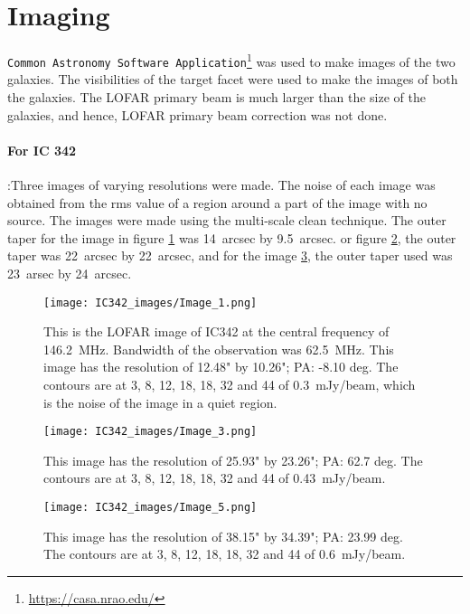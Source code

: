 \documentclass[../main/thesis_msc.tex]{subfiles}
\begin{document}
\section{Imaging}
\verb|Common Astronomy Software Application|\footnote{\url{https://casa.nrao.edu/}} was used to make images of the two galaxies. The visibilities of the target facet were used to make the images of both the galaxies. The LOFAR primary beam is much larger than the size of the galaxies, and hence, LOFAR primary beam correction was not done.  
\paragraph{For IC 342}:Three images of varying resolutions were made. The noise of each image was obtained from the rms value of a region around a part of the image with no source. The images were made using the multi-scale clean technique. The outer taper for the image in figure \ref{img1} was 14~arcsec by 9.5~arcsec. or figure \ref{img2}, the outer taper was 22~arcsec by 22~arcsec, and for the image \ref{img3}, the outer taper used was 23~arsec by 24~arcsec.

\begin{figure}[h]
\centering
\texttt{[image: IC342\_images/Image\_1.png]}
\caption{This is the LOFAR image of IC342 at the central frequency of 146.2~MHz. Bandwidth of the observation was 62.5~MHz. This image has the resolution of 12.48" by 10.26"; PA: -8.10 deg. The contours are at 3, 8, 12, 18, 18, 32 and 44 of 0.3~mJy/beam, which is the noise of the image in a quiet region.}
\label{img1}
\end{figure}

\begin{figure}[h]
\centering
\texttt{[image: IC342\_images/Image\_3.png]}
\caption{This image has the resolution of 25.93" by 23.26"; PA: 62.7 deg. The contours are at 3, 8, 12, 18, 18, 32 and 44 of 0.43~mJy/beam.}
\label{img2}
\end{figure}

\begin{figure}[h]
\centering
\texttt{[image: IC342\_images/Image\_5.png]}
\caption{This image has the resolution of 38.15" by 34.39"; PA: 23.99 deg. The contours are at 3, 8, 12, 18, 18, 32 and 44 of 0.6~mJy/beam.}
\label{img3}
\end{figure}
\end{document}
